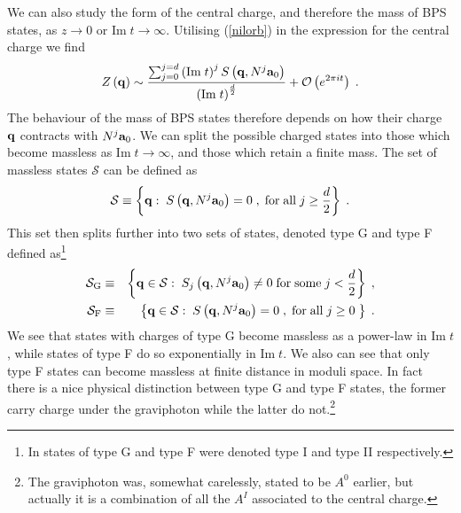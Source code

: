 \documentclass[11pt,a4paper]{article}
\numberwithin{equation}{section}
\numberwithin{table}{section}\setlength{\multlinegap}{25pt}
\newcommand{\bea}{\begin{eqnarray}}  \newcommand{\eea}{\end{eqnarray}}
\newcommand{\cO}{\mathcal{O}}
\newcommand{\cS}{\mathcal{S}}
\newcommand{\be}{\begin{equation}}
\newcommand{\ee}{\end{equation}}
\begin{document}
We can also study the form of the central charge, and therefore the mass of BPS states, as $z \rightarrow 0$ or $\mathrm{Im\;}t \rightarrow \infty$. Utilising (\ref{nilorb}) in the expression for the central charge we find
\be
Z\left( {\bf q} \right) \sim \frac{\sum_{j=0}^{j=d} \left(\mathrm{Im\;} t \right)^{j} S\left({\bf q},N^j{\bf a}_0 \right)}{\left(\mathrm{Im\;} t \right)^{\frac{d}{2}}} + \cO\left( e^{2 \pi i t}\right)\;.
\label{asycech}
\ee
The behaviour of the mass of BPS states therefore depends on how their charge ${\bf q}$ contracts with $N^j {\bf a}_0$. We can split the possible charged states into those which become massless as $\mathrm{Im\;}t \rightarrow \infty$, and those which retain a finite mass. The set of massless states $\cS$ can be defined as \cite{Grimm:2018ohb}
\be
\cS \equiv \left\{ \mathbf{q} : \;S\left({\bf q},N^j {\bf a}_0  \right) = 0 \;,\; \mathrm{for\;all}\; j \geq \frac{d}{2} \right\} \;. \label{masslesscondI1} 
\ee
This set then splits further into two sets of states, denoted type G and type F defined as\footnote{In \cite{Grimm:2018ohb} states of type G and type F were denoted type I and type II respectively.}
\bea
  \cS_{\rm G} &\equiv& \left\{ \mathbf{q} \in \cS:\; S_j\left({\bf q},N^j {\bf a}_0  \right) \neq 0 \;\mathrm{for\;some}\; j < \frac{d}{2}\right\} \;, \label{masslesscondI2} \\
  \cS_{\rm F} &\equiv& \left\{ \mathbf{q} \in \cS:\; S\left({\bf q},N^j {\bf a}_0  \right) = 0 \;,\; \mathrm{for\;all}\; j \geq 0 \; \right\} \;. \label{masslesscondII}
\eea
We see that states with charges of type G become massless as a power-law in $\mathrm{Im}\; t$, while states of type F do so exponentially in $\mathrm{Im}\; t$. We also can see that only type F states can become massless at finite distance in moduli space. In fact there is a nice physical distinction between type G and type F states, the former carry charge under the graviphoton while the latter do not.\footnote{The graviphoton was, somewhat carelessly, stated to be $A^0$ earlier, but actually it is a combination of all the $A^I$ associated to the central charge.}
\end{document}
